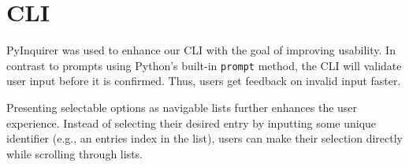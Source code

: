 \section{CLI}
\label{sec:cli}

PyInquirer was used to enhance our CLI with the goal of improving usability.
In contrast to prompts using Python's built-in \verb|prompt| method, the CLI will validate user input before it is confirmed.
Thus, users get feedback on invalid input faster.

Presenting selectable options as navigable lists further enhances the user experience.
Instead of selecting their desired entry by inputting some unique identifier (e.g., an entries index in the list), users can make their selection directly while scrolling through lists.

